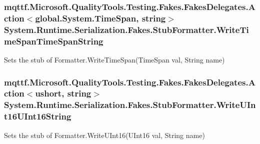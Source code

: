 \hypertarget{class_system_1_1_runtime_1_1_serialization_1_1_fakes_1_1_stub_formatter_ae262dd960f9932aae9e9e412628038de}{
\subsubsection[{Write\-Time\-Span\-Time\-Span\-String}]{\setlength{\rightskip}{0pt plus 5cm}mqttf.\-Microsoft.\-Quality\-Tools.\-Testing.\-Fakes.\-Fakes\-Delegates.\-Action$<$global.\-System.\-Time\-Span, string$>$ System.\-Runtime.\-Serialization.\-Fakes.\-Stub\-Formatter.\-Write\-Time\-Span\-Time\-Span\-String}}\label{class_system_1_1_runtime_1_1_serialization_1_1_fakes_1_1_stub_formatter_ae262dd960f9932aae9e9e412628038de}


Sets the stub of Formatter.\-Write\-Time\-Span(\-Time\-Span val, String name)

\hypertarget{class_system_1_1_runtime_1_1_serialization_1_1_fakes_1_1_stub_formatter_a9de8293da8ef4c533c5c92167c751b41}{
\subsubsection[{Write\-U\-Int16\-U\-Int16\-String}]{\setlength{\rightskip}{0pt plus 5cm}mqttf.\-Microsoft.\-Quality\-Tools.\-Testing.\-Fakes.\-Fakes\-Delegates.\-Action$<$ushort, string$>$ System.\-Runtime.\-Serialization.\-Fakes.\-Stub\-Formatter.\-Write\-U\-Int16\-U\-Int16\-String}}\label{class_system_1_1_runtime_1_1_serialization_1_1_fakes_1_1_stub_formatter_a9de8293da8ef4c533c5c92167c751b41}


Sets the stub of Formatter.\-Write\-U\-Int16(\-U\-Int16 val, String name)

